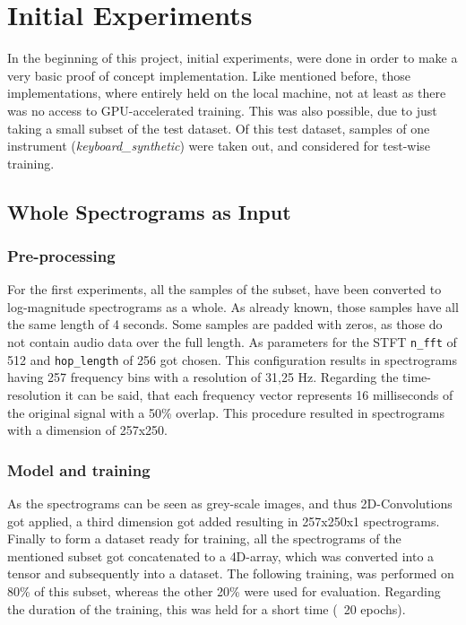  
\section{Initial Experiments}
In the beginning of this project, initial experiments, were done in order to make a very basic proof of concept implementation. Like mentioned before, those implementations, where entirely held on the local machine, not at least as there was no access to GPU-accelerated training. This was also possible, due to just taking a small subset of the test dataset. Of this test dataset, samples of one instrument (\textit{keyboard\_synthetic}) were taken out, and considered for test-wise training.

\subsection{Whole Spectrograms as Input}

\subsubsection{Pre-processing}
For the first experiments, all the samples of the subset, have been converted to log-magnitude spectrograms as a whole. As already known, those samples have all the same length of 4 seconds. Some samples are padded with zeros, as those do not contain audio data over the full length. As parameters for the STFT \texttt{n\_fft} of 512 and \texttt{hop\_length} of 256 got chosen. This configuration results in spectrograms having 257 frequency bins with a resolution of 31,25 Hz. Regarding the time-resolution it can be said, that each frequency vector represents 16 milliseconds of the original signal with a 50\% overlap. This procedure resulted in spectrograms with a dimension of 257x250. 

\subsubsection{Model and training}
As the spectrograms can be seen as grey-scale images, and thus 2D-Convolutions got applied, a third dimension got added resulting in 257x250x1 spectrograms.  Finally to form a dataset ready for training, all the spectrograms of the mentioned subset got concatenated to a 4D-array, which was converted into a tensor and subsequently into a dataset. The following training, was performed on 80\% of this subset, whereas the other 20\% were used for evaluation. Regarding the duration of the training, this was held for a short time (~20 epochs).

